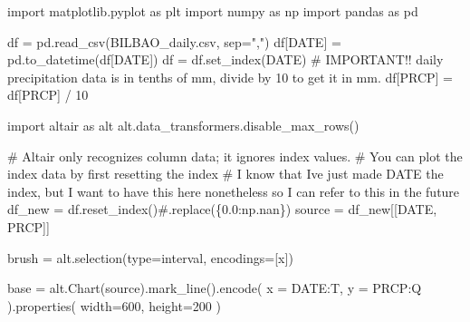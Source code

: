 \documentclass[
  letterpaper,
  DIV=11,
  numbers=noendperiod]{scrreprt}
\newenvironment{Shaded}{\begin{snugshade}}{\end{snugshade}}
\newcommand{\BuiltInTok}[1]{\textcolor[rgb]{0.00,0.23,0.31}{#1}}
\newcommand{\CommentTok}[1]{\textcolor[rgb]{0.37,0.37,0.37}{#1}}
\newcommand{\DecValTok}[1]{\textcolor[rgb]{0.68,0.00,0.00}{#1}}
\newcommand{\ImportTok}[1]{\textcolor[rgb]{0.00,0.46,0.62}{#1}}
\newcommand{\NormalTok}[1]{\textcolor[rgb]{0.00,0.23,0.31}{#1}}
\newcommand{\OperatorTok}[1]{\textcolor[rgb]{0.37,0.37,0.37}{#1}}
\newcommand{\StringTok}[1]{\textcolor[rgb]{0.13,0.47,0.30}{#1}}
\begin{document}
\begin{Shaded}
\begin{Highlighting}[]
\ImportTok{import}\NormalTok{ matplotlib.pyplot }\ImportTok{as}\NormalTok{ plt}
\ImportTok{import}\NormalTok{ numpy }\ImportTok{as}\NormalTok{ np}
\ImportTok{import}\NormalTok{ pandas }\ImportTok{as}\NormalTok{ pd}

\NormalTok{df }\OperatorTok{=}\NormalTok{ pd.read\_csv(}\StringTok{\textquotesingle{}BILBAO\_daily.csv\textquotesingle{}}\NormalTok{, sep}\OperatorTok{=}\StringTok{","}\NormalTok{)}
\NormalTok{df[}\StringTok{\textquotesingle{}DATE\textquotesingle{}}\NormalTok{] }\OperatorTok{=}\NormalTok{ pd.to\_datetime(df[}\StringTok{\textquotesingle{}DATE\textquotesingle{}}\NormalTok{])}
\NormalTok{df }\OperatorTok{=}\NormalTok{ df.set\_index(}\StringTok{\textquotesingle{}DATE\textquotesingle{}}\NormalTok{)}
\CommentTok{\# IMPORTANT!! daily precipitation data is in tenths of mm, divide by 10 to get it in mm.}
\NormalTok{df[}\StringTok{\textquotesingle{}PRCP\textquotesingle{}}\NormalTok{] }\OperatorTok{=}\NormalTok{ df[}\StringTok{\textquotesingle{}PRCP\textquotesingle{}}\NormalTok{] }\OperatorTok{/} \DecValTok{10}

\ImportTok{import}\NormalTok{ altair }\ImportTok{as}\NormalTok{ alt}
\NormalTok{alt.data\_transformers.disable\_max\_rows()}

\CommentTok{\# Altair only recognizes column data; it ignores index values.}
\CommentTok{\# You can plot the index data by first resetting the index}
\CommentTok{\# I know that I\textquotesingle{}ve just made \textquotesingle{}DATE\textquotesingle{} the index, but I want to have this here nonetheless so I can refer to this in the future}
\NormalTok{df\_new }\OperatorTok{=}\NormalTok{ df.reset\_index()}\CommentTok{\#.replace(\{0.0:np.nan\})}
\NormalTok{source }\OperatorTok{=}\NormalTok{ df\_new[[}\StringTok{\textquotesingle{}DATE\textquotesingle{}}\NormalTok{, }\StringTok{\textquotesingle{}PRCP\textquotesingle{}}\NormalTok{]]}

\NormalTok{brush }\OperatorTok{=}\NormalTok{ alt.selection(}\BuiltInTok{type}\OperatorTok{=}\StringTok{\textquotesingle{}interval\textquotesingle{}}\NormalTok{, encodings}\OperatorTok{=}\NormalTok{[}\StringTok{\textquotesingle{}x\textquotesingle{}}\NormalTok{])}

\NormalTok{base }\OperatorTok{=}\NormalTok{ alt.Chart(source).mark\_line().encode(}
\NormalTok{    x }\OperatorTok{=} \StringTok{\textquotesingle{}DATE:T\textquotesingle{}}\NormalTok{,}
\NormalTok{    y }\OperatorTok{=} \StringTok{\textquotesingle{}PRCP:Q\textquotesingle{}}
\NormalTok{).properties(}
\NormalTok{    width}\OperatorTok{=}\DecValTok{600}\NormalTok{,}
\NormalTok{    height}\OperatorTok{=}\DecValTok{200}
\NormalTok{)}


\end{Highlighting}
\end{Shaded}
\end{document}
